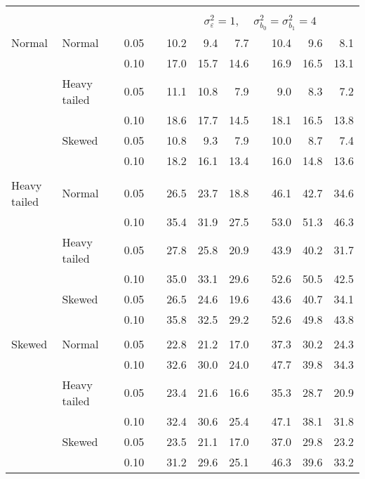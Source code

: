 \begin{table}[ht]
\begin{scriptsize}
\begin{tabular}{ll p{.1cm} c p{.1cm} rrr p{.1cm} rrr}
&&&&&&&&&&&\\
& && && \multicolumn{7}{c}{$\sigma_{\varepsilon}^2 = 1$, \ \ $\sigma_{b_0}^2 = \sigma_{b_1}^2 = 4$} \\ \cline{6-12}
\rowcolor{gray!20} Normal & Normal &  & 0.05 &  & 10.2 & 9.4 & 7.7 &  & 10.4 & 9.6 & 8.1 \\ 
\rowcolor{gray!20}   &  &  & 0.10 &  & 17.0 & 15.7 & 14.6 &  & 16.9 & 16.5 & 13.1 \\ 
\rowcolor{gray!20}   & Heavy tailed &  & 0.05 &  & 11.1 & 10.8 & 7.9 &  & 9.0 & 8.3 & 7.2 \\ 
\rowcolor{gray!20}   &  &  & 0.10 &  & 18.6 & 17.7 & 14.5 &  & 18.1 & 16.5 & 13.8 \\ 
\rowcolor{gray!20}   & Skewed &  & 0.05 &  & 10.8 & 9.3 & 7.9 &  & 10.0 & 8.7 & 7.4 \\ 
\rowcolor{gray!20}   &  &  & 0.10 &  & 18.2 & 16.1 & 13.4 &  & 16.0 & 14.8 & 13.6 \\ 
&&&&&&&&&&&\\
  Heavy tailed & Normal &  & 0.05 &  & 26.5 & 23.7 & 18.8 &  & 46.1 & 42.7 & 34.6 \\ 
   &  &  & 0.10 &  & 35.4 & 31.9 & 27.5 &  & 53.0 & 51.3 & 46.3 \\ 
   & Heavy tailed &  & 0.05 &  & 27.8 & 25.8 & 20.9 &  & 43.9 & 40.2 & 31.7 \\ 
   & &  & 0.10 &  & 35.0 & 33.1 & 29.6 &  & 52.6 & 50.5 & 42.5 \\ 
   & Skewed &  & 0.05 &  & 26.5 & 24.6 & 19.6 &  & 43.6 & 40.7 & 34.1 \\ 
   &  &  & 0.10 &  & 35.8 & 32.5 & 29.2 &  & 52.6 & 49.8 & 43.8 \\ 
&&&&&&&&&&&\\
  Skewed & Normal &  & 0.05 &  & 22.8 & 21.2 & 17.0 &  & 37.3 & 30.2 & 24.3 \\ 
   &  &  & 0.10 &  & 32.6 & 30.0 & 24.0 &  & 47.7 & 39.8 & 34.3 \\ 
   & Heavy tailed &  & 0.05 &  & 23.4 & 21.6 & 16.6 &  & 35.3 & 28.7 & 20.9 \\ 
   &  &  & 0.10 &  & 32.4 & 30.6 & 25.4 &  & 47.1 & 38.1 & 31.8 \\ 
   & Skewed &  & 0.05 &  & 23.5 & 21.1 & 17.0 &  & 37.0 & 29.8 & 23.2 \\ 
   &  &  & 0.10 &  & 31.2 & 29.6 & 25.1 &  & 46.3 & 39.6 & 33.2 \\ 


\hline
\end{tabular}
\end{scriptsize}
\end{table}



